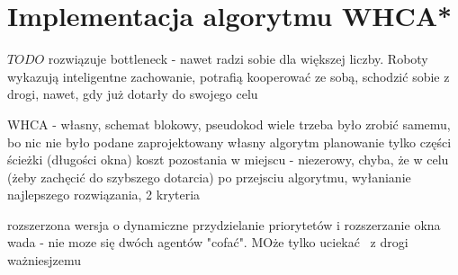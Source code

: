 \section{Implementacja algorytmu WHCA*}
\label{ch:alg-whca}

$TODO$ rozwiązuje bottleneck - nawet radzi sobie dla większej liczby.
Roboty wykazują inteligentne zachowanie, potrafią kooperować ze sobą, schodzić sobie z drogi, nawet, gdy już dotarły do swojego celu

WHCA - własny, schemat blokowy, pseudokod
wiele trzeba było zrobić samemu, bo nic nie było podane
zaprojektowany własny algorytm
planowanie tylko części ścieżki (długości okna)
koszt pozostania w miejscu - niezerowy,  chyba, że w celu (żeby zachęcić do szybszego dotarcia)
po przejsciu algorytmu, wyłanianie najlepszego rozwiązania, 2 kryteria

rozszerzona wersja o dynamiczne przydzielanie priorytetów i rozszerzanie okna
wada - nie moze się dwóch agentów "cofać". MOże tylko uciekać  z drogi ważniesjzemu